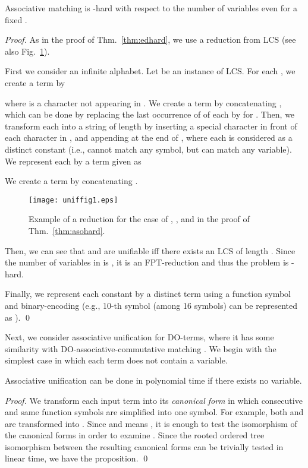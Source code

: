 \documentclass[a4paper]{llncs}
\begin{document}
\begin{theorem}
Associative matching is -hard with respect to the number of variables
even for a fixed .
\label{thm:asohard}
\end{theorem}
\begin{proof}
As in the proof of Thm.~\ref{thm:edhard},
we use a reduction from LCS (see also Fig.~\ref{fig:asohard}).

First we consider an infinite alphabet.
Let  be an instance of LCS.
For each , we create a term  by

where  is a character not appearing in .
We create a term  by concatenating , which can be done
by replacing the last occurrence of  of each
 by  for .
Then, we transform each  into a string  of length
 by inserting a special character  
in front of each character in , and appending 
at the end of ,
where each  is considered as a distinct constant
(i.e.,  cannot match any symbol, but can match any variable).
We represent each  by a term  given as

We create a term  by concatenating .

\begin{figure}[ht]
\begin{center}
\texttt{[image: uniffig1.eps]}
\caption{Example of a reduction for the case of , ,
and  in the proof of Thm.~\ref{thm:asohard}.}
\label{fig:asohard}
\end{center}
\end{figure}

Then, we can see that  and  are unifiable
iff there exists an LCS of length .
Since the number of variables in  is ,
it is an FPT-reduction and thus the problem is -hard.

Finally, we represent each constant by a distinct term using
a function symbol  and binary-encoding 
(e.g., 10-th symbol (among 16 symbols) can be represented as
 ).
\qed
\end{proof}

Next, we consider associative unification for DO-terms,
where it has some similarity with DO-associative-commutative matching
\cite{benanav87}.
We begin with the simplest case in which each term does not
contain a variable.

\begin{proposition}
Associative unification can be done in polynomial time if
there exists no variable.
\end{proposition}
\begin{proof}
We transform each input term into its \emph{canonical form} in which 
consecutive and same function symbols are simplified into one symbol.
For example, both  and 
are transformed into .
Since  and  means ,
it is enough to test the isomorphism of the canonical forms in order to
examine .
Since the rooted ordered tree isomorphism between the resulting
canonical forms can be trivially tested in linear time,
we have the proposition.
\qed
\end{proof}
\end{document}
